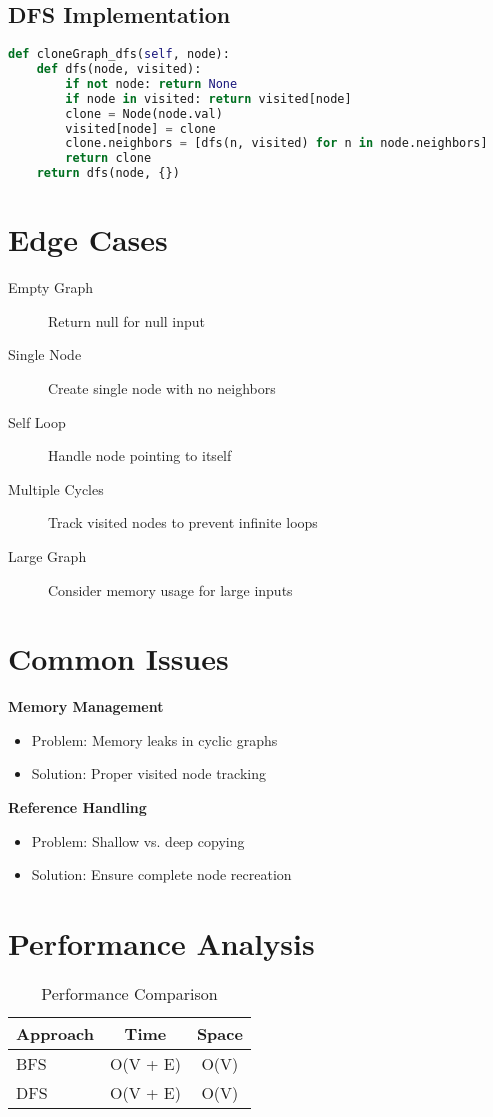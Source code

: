 \subsection*{DFS Implementation}
\begin{lstlisting}[language=Python]
def cloneGraph_dfs(self, node):
    def dfs(node, visited):
        if not node: return None
        if node in visited: return visited[node]
        clone = Node(node.val)
        visited[node] = clone
        clone.neighbors = [dfs(n, visited) for n in node.neighbors]
        return clone
    return dfs(node, {})
\end{lstlisting}

\section*{Edge Cases}
\begin{description}
    \item[Empty Graph] Return null for null input
    \item[Single Node] Create single node with no neighbors
    \item[Self Loop] Handle node pointing to itself
    \item[Multiple Cycles] Track visited nodes to prevent infinite loops
    \item[Large Graph] Consider memory usage for large inputs
\end{description}

\section*{Common Issues}
\textbf{Memory Management}
\begin{itemize}
    \item Problem: Memory leaks in cyclic graphs
    \item Solution: Proper visited node tracking
\end{itemize}

\textbf{Reference Handling}
\begin{itemize}
    \item Problem: Shallow vs. deep copying
    \item Solution: Ensure complete node recreation
\end{itemize}

\section*{Performance Analysis}
\begin{table}[h]
    \centering
    \begin{tabular}{|l|c|c|}
        \hline
        \textbf{Approach} & \textbf{Time} & \textbf{Space} \\
        \hline
        BFS & O(V + E) & O(V) \\
        DFS & O(V + E) & O(V) \\
        \hline
    \end{tabular}
    \caption{Performance Comparison}
\end{table}

